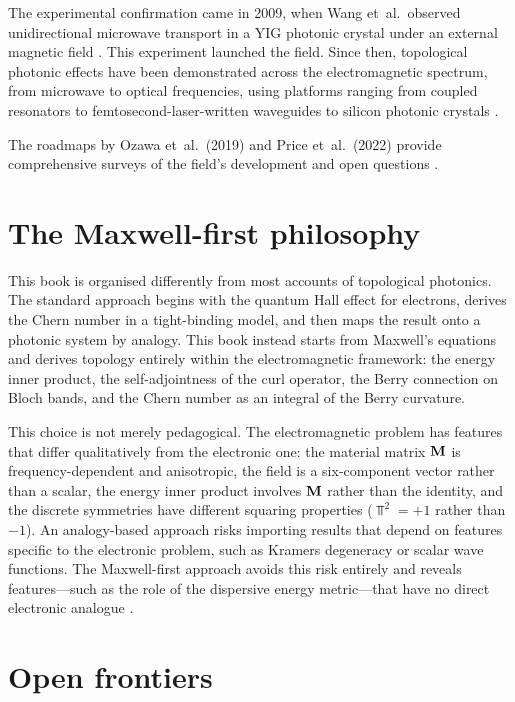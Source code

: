 The experimental confirmation came in 2009, when Wang et~al.\
observed unidirectional microwave transport in a YIG photonic crystal
under an external magnetic field
\cite{nature2026observation}.  This experiment launched the field.
Since then, topological photonic effects have been demonstrated across
the electromagnetic spectrum, from microwave to optical frequencies,
using platforms ranging from coupled resonators
\cite{hafezi2013imaging} to femtosecond-laser-written waveguides
\cite{rechtsman2013photonica} to silicon photonic crystals
\cite{ma2016all,wu2017direct}.

The roadmaps by Ozawa et~al.\ (2019) and Price et~al.\ (2022) provide
comprehensive surveys of the field's development and open questions
\cite{ozawa2018topological,price2022roadmap}.

\section{The Maxwell-first philosophy}
\label{sec:ch1-maxwell-first}

This book is organised differently from most accounts of topological
photonics.  The standard approach begins with the quantum Hall effect
for electrons, derives the Chern number in a tight-binding model, and
then maps the result onto a photonic system by analogy.  This book
instead starts from Maxwell's equations and derives topology entirely
within the electromagnetic framework: the energy inner product, the
self-adjointness of the curl operator, the Berry connection on Bloch
bands, and the Chern number as an integral of the Berry curvature.

This choice is not merely pedagogical.  The electromagnetic problem
has features that differ qualitatively from the electronic one: the
material matrix $\mathbf{M}$ is frequency-dependent and anisotropic, the
field is a six-component vector rather than a scalar, the energy inner
product involves $\mathbf{M}$ rather than the identity, and the discrete
symmetries have different squaring properties ($\Top^2=+1$ rather
than $-1$).  An analogy-based approach risks importing results that
depend on features specific to the electronic problem, such as Kramers
degeneracy or scalar wave functions.  The Maxwell-first approach avoids
this risk entirely and reveals features---such as the role of the
dispersive energy metric---that have no direct electronic analogue
\cite{gangaraj2016berry,silveirinha2016bulk}.

\section{Open frontiers}
\label{sec:ch1-frontiers}

